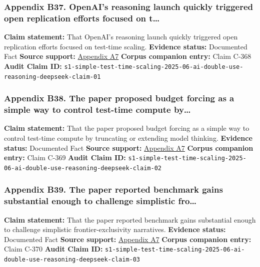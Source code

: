 \documentclass[
  american,
  11pt,
  letterpaper,
]{article}
\begin{document}
\subsubsection{Appendix B37. OpenAI's reasoning launch quickly triggered
open replication efforts focused on
t\ldots{}}\label{ch-06-appendix-b37-openai-s-reasoning-launch-quickly-triggered-open-replication-efforts-focused-on-t}

\textbf{Claim statement:} That OpenAI's reasoning launch quickly
triggered open replication efforts focused on test-time scaling.
\textbf{Evidence status:} Documented Fact \textbf{Source support:}
\hyperref[ch-06-appendix-a7-s1-simple-test-time-scaling]{Appendix A7}
\textbf{Corpus companion entry:} Claim C-368 \textbf{Audit Claim ID:}
\texttt{s1-simple-test-time-scaling-2025-06-ai-double-use-reasoning-deepseek-claim-01}

\subsubsection{Appendix B38. The paper proposed budget forcing as a
simple way to control test-time compute
by\ldots{}}\label{ch-06-appendix-b38-the-paper-proposed-budget-forcing-as-a-simple-way-to-control-test-time-compute-by}

\textbf{Claim statement:} That the paper proposed budget forcing as a
simple way to control test-time compute by truncating or extending model
thinking. \textbf{Evidence status:} Documented Fact \textbf{Source
support:}
\hyperref[ch-06-appendix-a7-s1-simple-test-time-scaling]{Appendix A7}
\textbf{Corpus companion entry:} Claim C-369 \textbf{Audit Claim ID:}
\texttt{s1-simple-test-time-scaling-2025-06-ai-double-use-reasoning-deepseek-claim-02}

\subsubsection{Appendix B39. The paper reported benchmark gains
substantial enough to challenge simplistic
fro\ldots{}}\label{ch-06-appendix-b39-the-paper-reported-benchmark-gains-substantial-enough-to-challenge-simplistic-fro}

\textbf{Claim statement:} That the paper reported benchmark gains
substantial enough to challenge simplistic frontier-exclusivity
narratives. \textbf{Evidence status:} Documented Fact \textbf{Source
support:}
\hyperref[ch-06-appendix-a7-s1-simple-test-time-scaling]{Appendix A7}
\textbf{Corpus companion entry:} Claim C-370 \textbf{Audit Claim ID:}
\texttt{s1-simple-test-time-scaling-2025-06-ai-double-use-reasoning-deepseek-claim-03}
\end{document}
